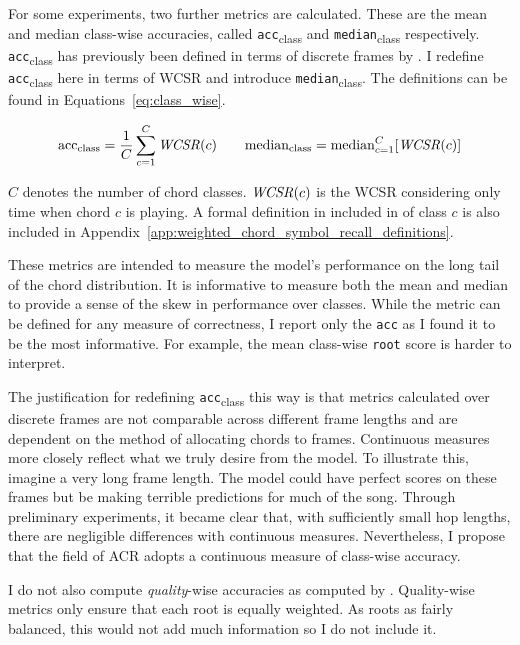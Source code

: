 For some experiments, two further metrics are calculated. These are the mean and median class-wise accuracies, called \texttt{acc}\textsubscript{class} and \texttt{median}\textsubscript{class} respectively. \texttt{acc}\textsubscript{class} has previously been defined in terms of discrete frames by \citet{ACRLargeVocab1}. I redefine \texttt{acc}\textsubscript{class} here in terms of WCSR and introduce \texttt{median}\textsubscript{class}. The definitions can be found in Equations~\ref{eq:class_wise}.

\begin{equation}\label{eq:class_wise}
    \text{acc}\textsubscript{class} = \frac{1}{C} \sum_{c=1}^{C} \text{\emph{WCSR}}(c)
\quad \quad
    \text{median}\textsubscript{class} = \text{median}_{c=1}^{C} [\text{\emph{WCSR}}(c)]
\end{equation}

$C$ denotes the number of chord classes. $\text{\emph{WCSR}}(c)$ is the WCSR considering only time when chord $c$ is playing. A formal definition in included in of class $c$ is also included in Appendix~\ref{app:weighted_chord_symbol_recall_definitions}.

These metrics are intended to measure the model's performance on the long tail of the chord distribution. It is informative to measure both the mean and median to provide a sense of the skew in performance over classes. While the metric can be defined for any measure of correctness, I report only the \texttt{acc} as I found it to be the most informative. For example, the mean class-wise \texttt{root} score is harder to interpret.

The justification for redefining \texttt{acc}\textsubscript{class} this way is that metrics calculated over discrete frames are not comparable across different frame lengths and are dependent on the method of allocating chords to frames. Continuous measures more closely reflect what we truly desire from the model. To illustrate this, imagine a very long frame length. The model could have perfect scores on these frames but be making terrible predictions for much of the song. Through preliminary experiments, it became clear that, with sufficiently small hop lengths, there are negligible differences with continuous measures. Nevertheless, I propose that the field of ACR adopts a continuous measure of class-wise accuracy.

I do not also compute \emph{quality}-wise accuracies as computed by \citet{CurriculumLearning}. Quality-wise metrics only ensure that each root is equally weighted. As roots as fairly balanced, this would not add much information so I do not include it.

